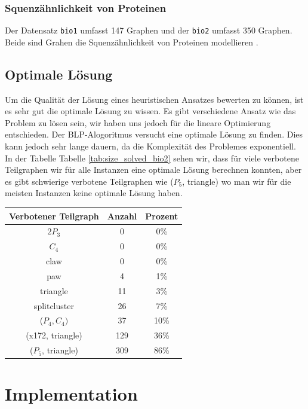 \documentclass[12pt,a4paper,onecolumn,oneside,titlepage]{article}
\newcommand{\vars}{\texttt}
\begin{document}
\subsubsection{Squenzähnlichkeit von Proteinen}
Der Datensatz  \vars{bio1} umfasst 147 Graphen und der \vars{bio2} umfasst 350 Graphen. Beide sind Grahen die Squenzähnlichkeit von Proteinen modellieren \cite{Rahmann07} \cite{Bocker08}.

\subsection{Optimale Lösung}
Um die Qualität der Lösung eines heuristischen Ansatzes bewerten zu können, ist es sehr gut die optimale Lösung zu wissen. Es gibt verschiedene Ansatz wie das Problem zu lösen sein, wir haben uns jedoch für die lineare Optimierung entschieden. Der BLP-Alogoritmus versucht eine optimale Lösung zu finden. Dies kann jedoch sehr lange dauern, da die Komplexität des Problemes exponentiell. 
In der Tabelle Tabelle \ref{tab:size_solved_bio2} sehen wir, dass für viele verbotene Teilgraphen wir für alle Instanzen eine optimale Lösung berechnen konnten, aber es gibt schwierige verbotene Teilgraphen wie ($P_5$, triangle) wo man wir für die meisten Instanzen keine optimale Lösung haben.
\begin{center}
\label{tab:size_solved_bio2}
\begin{tabular}{ccc}
\hline 
Verbotener Teilgraph & Anzahl & Prozent \\ 
\hline
$2 P_3$ & 0 & 0\% \\ 
$C_4$ & 0 & 0\% \\ 
claw & 0 & 0\% \\ 
paw & 4 & 1\% \\ 
triangle & 11 & 3\% \\ 
splitcluster & 26 & 7\% \\ 
($P_4,C_4)$ & 37 & 10\% \\ 
(x172, triangle) & 129 & 36\% \\ 
($P_5$, triangle)& 309 & 86\% \\ 
\hline
\end{tabular} 
\end{center}


\section{Implementation}

\label{sec:implementation}
\end{document}
